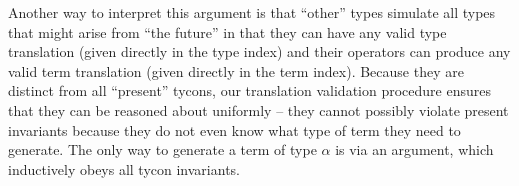 Another way to interpret this argument is that ``other'' types simulate all types that might arise from ``the future'' in that they can have any valid type translation (given directly in the type index) and their operators can produce any valid term translation (given directly in the term index). Because they are distinct from all ``present'' tycons, our translation validation procedure  ensures that they can be reasoned about uniformly -- they cannot possibly violate present invariants because they do not even know what type of term they need to generate. The only way to generate a term of type $\alpha$ is via an argument, which inductively obeys all tycon invariants.



